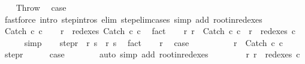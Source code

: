 \begin{isabellebody}
\isamarkupfalse%
\isanewline
\ \ \isamarkupfalse%
\ Throw\ \isamarkupfalse%
\ {\isacharquery}case\ \isanewline
\ \ \ \ \isamarkupfalse%
\ {\isacharparenleft}fastforce\ intro{\isacharcolon}\ step{\isachardot}intros\ elim{\isacharcolon}\ step{\isacharunderscore}elim{\isacharunderscore}cases\ simp\ add{\isacharcolon}\ root{\isacharunderscore}in{\isacharunderscore}redexes{\isacharparenright}\isanewline
{}\isamarkupfalse%
\isanewline
\ \ \isamarkupfalse%
\ {\isacharparenleft}Catch\ c\ c\isanewline
\ \ \isamarkupfalse%
\ {\isachardoublequoteopen}r\ {\isasymin}\ redexes\ {\isacharparenleft}Catch\ c\ c\ \isamarkupfalse%
\ fact\isanewline
\ \ \isamarkupfalse%
\ r{\isacharcolon}\ {\isachardoublequoteopen}r\ {\isacharequal}\ Catch\ c\ c\ {\isasymor}\ r\ {\isasymin}\ redexes\ c\isanewline
\ \ \ \ \isamarkupfalse%
\ simp\isanewline
\ \ \isamarkupfalse%
\ step{\isacharunderscore}r{\isacharcolon}\ {\isachardoublequoteopen}{\isasymGamma}{\isasymturnstile}\ {\isacharparenleft}r{\isacharcomma}\ s{\isacharparenright}\ {\isasymrightarrow}\ {\isacharparenleft}r{\isacharprime}{\isacharcomma}\ s{\isacharprime}{\isacharparenright}{\isachardoublequoteclose}\ \isamarkupfalse%
\ fact\isanewline
\ \ \isamarkupfalse%
\ r\ \isamarkupfalse%
\ {\isacharquery}case\isanewline
\ \ \isamarkupfalse%
\ \isanewline
\ \ \ \ \isamarkupfalse%
\ {\isachardoublequoteopen}r\ {\isacharequal}\ Catch\ c\ c\isanewline
\ \ \ \ \isamarkupfalse%
\ step{\isacharunderscore}r\isanewline
\ \ \ \ \isamarkupfalse%
\ {\isacharquery}case\isanewline
\ \ \ \ \ \ \isamarkupfalse%
\ {\isacharparenleft}auto\ simp\ add{\isacharcolon}\ root{\isacharunderscore}in{\isacharunderscore}redexes{\isacharparenright}\isanewline
\ \ \isamarkupfalse%
\isanewline
\ \ \ \ \isamarkupfalse%
\ r{\isacharcolon}\ {\isachardoublequoteopen}r\ {\isasymin}\ redexes\ c\isanewline
\ \ \ \ \isamarkupfalse%

\end{isabellebody}
